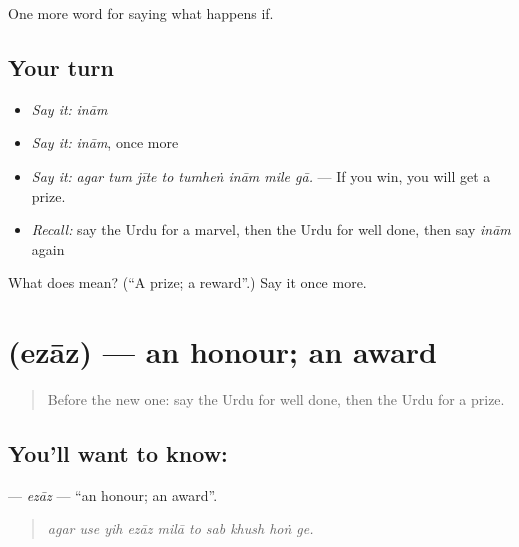 \begin{grammarlens}[title={What you've built}]
One more word for saying what happens if.
\end{grammarlens}

\subsection*{Your turn}
\begin{itemize}
\raggedright
  \item \emph{Say it:} \emph{inām}
  \item \emph{Say it:} \emph{inām}, once more
  \item \emph{Say it:} \emph{agar tum jīte to tumheṅ inām mile gā.} — If you win, you will get a prize.
  \item \emph{Recall:} say the Urdu for a marvel, then the Urdu for well done, then say \emph{inām} again
\end{itemize}

\begin{tcolorbox}[breakable,colback=teal!4,colframe=teal!35!black,title={Before you move on}]
What does  mean? (\textquotedblleft{}A prize; a reward\textquotedblright{}.) Say it once more.
\end{tcolorbox}
\section[\texorpdfstring{\ur{اعزاز} (ezāz)}{اعزاز (ezāz)}]{ (ezāz) — an honour; an award}

\label{lesson:UR-C382-ezaz}



\begin{quote}
Before the new one: say the Urdu for well done, then the Urdu for a prize.
\end{quote}

\subsection*{You'll want to know: }
\textbf{} — \emph{ezāz} — \textquotedblleft{}an honour; an award\textquotedblright{}.

\begin{quote}
         
\end{quote}

\begin{quote}
\emph{agar use yih ezāz milā to sab khush hoṅ ge.}
\end{quote}

